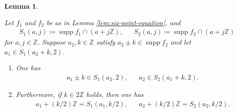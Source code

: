 \documentclass[12pt]{article}
\newtheorem{lemma}[theorem]{Lemma}
\theoremstyle{definition}
\theoremstyle{remark}
\numberwithin{equation}{section}
\numberwithin{figure}{section}
\numberwithin{table}{section}
\DeclareMathOperator{\supp}{supp}
\begin{document}
\begin{lemma}
   \label{lem:supp-arithmetic-progression}

Let $ f_1 $ and $ f_2 $ be as in Lemma \ref{lem:six-point-equation}, and
\begin{align}
    S_1 ( a , j ) \coloneqq \supp f_1 \cap ( a + j \mathbb{ Z } ), & &
    S_2 ( a , j ) \coloneqq \supp f_2 \cap ( a + j \mathbb{ Z } ) \label{eq:supp-arithmetic-progression-S-define}
\end{align}
for $ a , j \in \mathbb{ Z } $.
Suppose $ a_2 , k \in \mathbb{ Z } $ satisfy $ a_2 \pm k \in \supp f_2 $ and let $ a_1 \in S_1 ( a_2 + k , 2 ) $.

\begin{enumerate}
    \item \label{item:supp-arithmetic-progression-supp}

    One has
    \begin{align}
        a_1 \pm k \in S_1 ( a_2 , 2 ), & &
        a_2 \in S_2 ( a_1 + k , 2 ). \label{eq:supp-arithmetic-progression-supp-include}
    \end{align}

\item \label{item:supp-arithmetic-progression-main}

Furthermore, if $ k \in 2 \mathbb{ Z } $ holds, then one has
\begin{align}
    a_1 + ( k / 2 ) \mathbb{ Z } = S_1 ( a_1 , k / 2 ), & &
    a_2 + ( k / 2 ) \mathbb{ Z } = S_2 ( a_2 , k / 2 ).
\end{align}

\end{enumerate}

\end{lemma}
\end{document}
